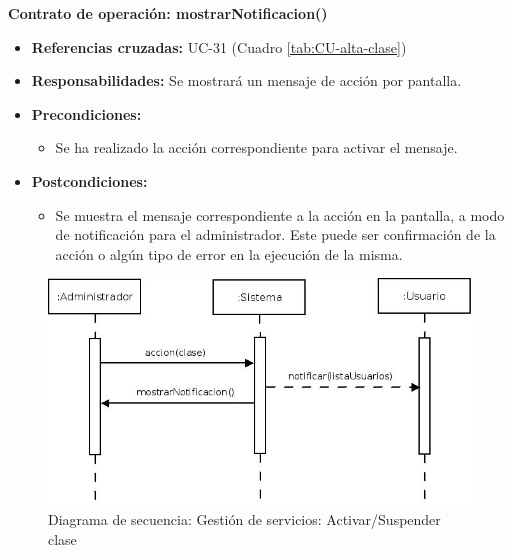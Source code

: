 \textbf{Contrato de operación: mostrarNotificacion()}
\begin{itemize}
\item \textbf{Referencias cruzadas:} UC-31 (Cuadro \ref{tab:CU-alta-clase})
\item \textbf{Responsabilidades:} Se mostrará un mensaje de acción por pantalla.
\item \textbf{Precondiciones:} 
 \begin{itemize}
\item Se ha realizado la acción correspondiente para activar el mensaje.
\end {itemize}
\item \textbf{Postcondiciones:} 
 \begin{itemize}
\item Se muestra el mensaje correspondiente a la acción en la pantalla, a modo de notificación para el administrador. Este puede ser confirmación de la acción o algún tipo de error en la ejecución de la misma.
\end {itemize}
\end {itemize}


\vspace{7mm}
\dotfill
\vspace{7mm}

\begin{figure}[h!]
\centering
  \includegraphics[scale=.55]{img/secuencias/gestion-servicios-suspender-activar-clase.jpeg}
  \caption{Diagrama de secuencia: Gestión de servicios: Activar/Suspender clase}
  \label{fig:secuencia-gestion-servicios-suspender-activar-clase}
\end{figure}

